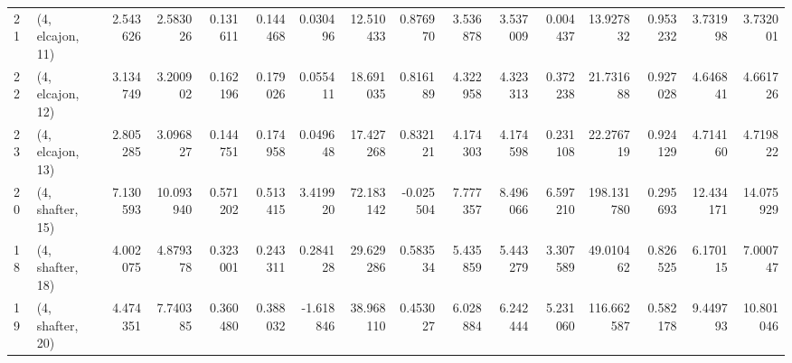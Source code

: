 \begin{tabular}{llrrrrrrrrrrrrrr}
21 &  (4, elcajon, 11) &  2.543626 &   2.583026 &   0.131611 &  0.144468 &  0.030496 &   12.510433 &  0.876970 &   3.536878 &   3.537009 &   0.004437 &   13.927832 &  0.953232 &   3.731998 &   3.732001 \\
22 &  (4, elcajon, 12) &  3.134749 &   3.200902 &   0.162196 &  0.179026 &  0.055411 &   18.691035 &  0.816189 &   4.322958 &   4.323313 &   0.372238 &   21.731688 &  0.927028 &   4.646841 &   4.661726 \\
23 &  (4, elcajon, 13) &  2.805285 &   3.096827 &   0.144751 &  0.174958 &  0.049648 &   17.427268 &  0.832121 &   4.174303 &   4.174598 &   0.231108 &   22.276719 &  0.924129 &   4.714160 &   4.719822 \\
20 &  (4, shafter, 15) &  7.130593 &  10.093940 &   0.571202 &  0.513415 &  3.419920 &   72.183142 & -0.025504 &   7.777357 &   8.496066 &   6.597210 &  198.131780 &  0.295693 &  12.434171 &  14.075929 \\
18 &  (4, shafter, 18) &  4.002075 &   4.879378 &   0.323001 &  0.243311 &  0.284128 &   29.629286 &  0.583534 &   5.435859 &   5.443279 &   3.307589 &   49.010462 &  0.826525 &   6.170115 &   7.000747 \\
19 &  (4, shafter, 20) &  4.474351 &   7.740385 &   0.360480 &  0.388032 & -1.618846 &   38.968110 &  0.453027 &   6.028884 &   6.242444 &   5.231060 &  116.662587 &  0.582178 &   9.449793 &  10.801046 \\
\bottomrule
\end{tabular}
